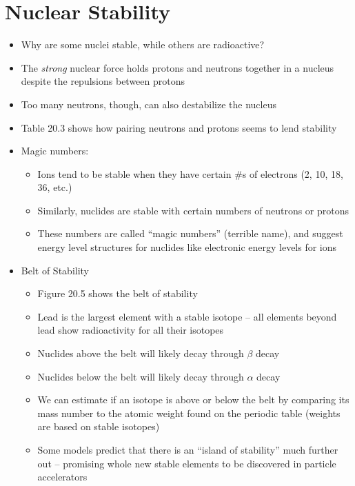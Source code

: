 \documentclass[12pt, openany, letterpaper]{memoir}
\begin{document}
\section{Nuclear Stability}
\begin{itemize}
	\item Why are some nuclei stable, while others are radioactive?
	\item The \emph{strong} nuclear force holds protons and neutrons together in a nucleus despite the repulsions between protons
	\item Too many neutrons, though, can also destabilize the nucleus
	\item Table 20.3 shows how pairing neutrons and protons seems to lend stability
	\item Magic numbers:
	\begin{itemize}
		\item Ions tend to be stable when they have certain \#s of electrons (2, 10, 18, 36, etc.)
		\item Similarly, nuclides are stable with certain numbers of neutrons or protons
		\item These numbers are called ``magic numbers'' (terrible name), and suggest energy level structures for nuclides like electronic energy levels for ions
	\end{itemize}
	\item Belt of Stability
	\begin{itemize}
		\item Figure 20.5 shows the belt of stability
		\item Lead is the largest element with a stable isotope -- all elements beyond lead show radioactivity for all their isotopes
		\item Nuclides above the belt will likely decay through $\beta$ decay
		\item Nuclides below the belt will likely decay through $\alpha$ decay
		\item We can estimate if an isotope is above or below the belt by comparing its mass number to the atomic weight found on the periodic table (weights are based on stable isotopes)
		\item Some models predict that there is an ``island of stability'' much further out -- promising whole new stable elements to be discovered in particle accelerators
	\end{itemize}
\end{itemize}
\end{document}
